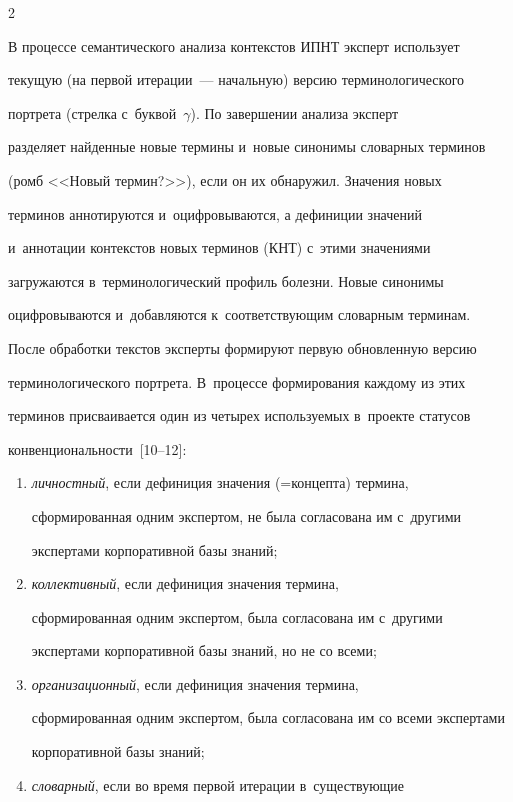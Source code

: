\begin{multicols}{2}
  

  В процессе семантического анализа контекстов ИПНТ эксперт использует 

текущую (на первой итерации~--- начальную) версию терминологического 

портрета (стрелка с~буквой~$\gamma$). По завершении анализа эксперт 

разделяет найденные новые термины и~новые синонимы словарных терминов 

(ромб <<Новый термин?>>), если он их обнаружил. Значения новых 

терминов аннотируются и~оцифровываются, а дефиниции значений 

и~аннотации контекстов новых терминов (КНТ) с~этими значениями 

загружаются в~терминологический профиль болезни. Новые синонимы 

оцифровываются и~добавляются к~соответствующим словарным терминам. 

После обработки текстов эксперты формируют первую обновленную версию 

терминологического портрета. В~процессе формирования каждому из этих 

терминов присваивается один из четырех используемых в~проекте статусов 

конвенциональности~[10--12]:

  \begin{enumerate}[(1)]

  \item \textit{личностный}, если дефиниция значения (=\;кон\-цеп\-та) термина, 

сформированная одним экспертом, не была согласована им с~другими 

экспертами корпоративной базы знаний;

  \item \textit{коллективный}, если дефиниция значения термина, 

сформированная одним экспертом, была согласована им с~другими 

экспертами корпоративной базы знаний, но не со всеми;

  \item \textit{организационный}, если дефиниция значения термина, 

сформированная одним экспертом, была согласована им со всеми экспертами 

корпоративной базы знаний;

  \item \textit{словарный}, если во время первой итерации в~существующие 


\end{enumerate}
\end{multicols}
